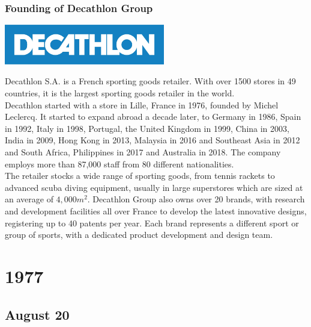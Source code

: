 \documentclass[11pt]{report}
\begin{document}
\subsection{Founding of Decathlon Group}
\vspace{2mm}\begin{center}\includegraphics[width=7cm]{./img/decathlonLogo.jpg}\end{center}
Decathlon S.A. is a French sporting goods retailer. With over 1500 stores in 49 countries, it is the largest sporting goods retailer in the world.\\
\indent Decathlon started with a store in Lille, France in 1976, founded by Michel Leclercq. It started to expand abroad a decade later, to Germany in 1986, Spain in 1992, Italy in 1998, Portugal, the United Kingdom in 1999, China in 2003, India in 2009, Hong Kong in 2013, Malaysia in 2016 and Southeast Asia in 2012 and South Africa, Philippines in 2017 and Australia in 2018. The company employs more than 87,000 staff from 80 different nationalities.\\ \indent The retailer stocks a wide range of sporting goods, from tennis rackets to advanced scuba diving equipment, usually in large superstores which are sized at an average of $4,000m^{2}$. Decathlon Group also owns over 20 brands, with research and development facilities all over France to develop the latest innovative designs, registering up to 40 patents per year. Each brand represents a different sport or group of sports, with a dedicated product development and design team.

\chapter{1977}
\section{August 20}
\end{document}
